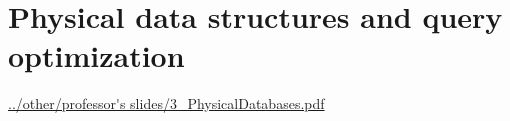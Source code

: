 \section{Physical data structures
and query optimization}
\url{../other/professor's slides/3_PhysicalDatabases.pdf}
